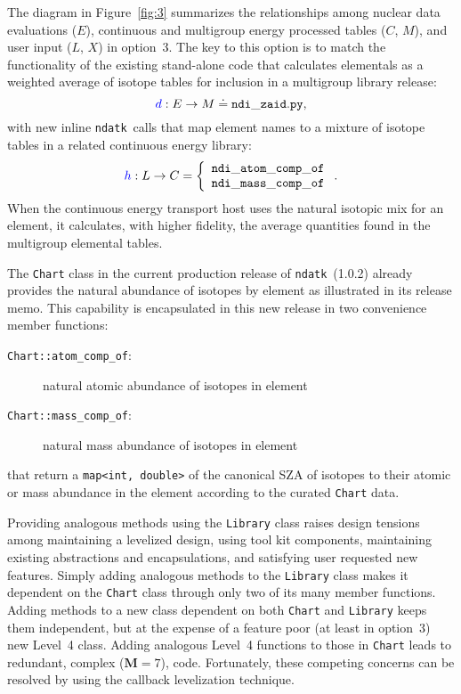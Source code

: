 \documentclass[12pt]{lamemo}
\newcommand{\ndatk}{\texttt{ndatk}}
\begin{document}
The diagram in Figure~\ref{fig:3} summarizes the relationships among
nuclear data evaluations ($E$), continuous and multigroup energy
processed tables ($C$, $M$), and user input ($L$, $X$) in option~3.
The key to this option is to match the functionality of the existing
stand-alone code that calculates elementals as a weighted average of
isotope tables for inclusion in a multigroup library release:
\[
\textcolor{blue}{d}:E \rightarrow M \doteq \mathtt{ndi\_zaid.py},
\]
with new inline \ndatk\ calls that map element names to a mixture of
isotope tables in a related continuous energy library:
\[
\textcolor{blue}{h}:L \rightarrow C = \left\{ \begin{array}{l}
    \mathtt{ndi\_atom\_comp\_of} \\
    \mathtt{ndi\_mass\_comp\_of}
    \end{array} \right. .
\]
When the continuous energy transport host uses the natural isotopic
mix for an element, it calculates, with higher fidelity, the average
quantities found in the multigroup elemental tables.  

The \texttt{Chart} class in the current production release of \ndatk\
(1.0.2) already provides the natural abundance of isotopes by element
as illustrated in its release memo\cite[Appendix~II]{gray14}.  This
capability is encapsulated in this new release in two convenience
member functions:
\begin{description}
\item[\texttt{Chart::atom\_comp\_of}: ] natural atomic abundance of
  isotopes in element
\item[\texttt{Chart::mass\_comp\_of}: ] natural mass abundance of
  isotopes in element
\end{description}
that return a \texttt{map<int, double>} of the canonical SZA of
isotopes to their atomic or mass abundance in the element according to
the curated \texttt{Chart} data.

Providing analogous methods using the \texttt{Library} class raises
design tensions among maintaining a levelized design\cite{lakos96},
using tool kit components, maintaining existing abstractions and
encapsulations\cite{gray14}, and satisfying user requested new
features.  Simply adding analogous methods to the \texttt{Library}
class makes it dependent on the \texttt{Chart} class through only two
of its many member functions.  Adding methods to a new class dependent
on both \texttt{Chart} and \texttt{Library} keeps them independent,
but at the expense of a feature poor (at least in option~3) new
Level~4 class.  Adding analogous Level~4 functions to those in
\texttt{Chart} leads to redundant, complex\cite{wiki} ($\mathbf{M} =
7$), code.  Fortunately, these competing concerns can be resolved by
using the callback levelization technique.
\end{document}

